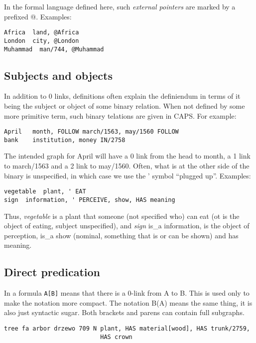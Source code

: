 \documentclass[11pt,bookmarks,bookmarksnumbered,naturalnames,plainpages=false,pdftex,colorlinks=true,urlcolor=blue,bookmarksdepth=subsection,plainpages=false]{paper}
\begin{document}
In the formal language defined here, such {\it external pointers} are marked
by a prefixed @. Examples:

\begin{verbatim}
Africa	land, @Africa	
London	city, @London	
Muhammad  man/744, @Muhammad	
\end{verbatim}

\subsection{Subjects and objects}\label{subjobj}

In addition to 0 links, definitions often explain the definiendum in terms of
it being the subject or object of some binary relation. When not defined by
some more primitive term, such binary telations are given in CAPS.  For
example:

\begin{verbatim}
April   month, FOLLOW march/1563, may/1560 FOLLOW
bank    institution, money IN/2758
\end{verbatim}

\noindent
The intended graph for April will have a 0 link from the head to month, a 1
link to march/1563 and a 2 link to may/1560. Often, what is at the other side
of the binary is unspecified, in which case we use the ' symbol ``plugged
up''.  Examples:

\begin{verbatim}
vegetable  plant, ' EAT
sign  information, ' PERCEIVE, show, HAS meaning
\end{verbatim}

\noindent
Thus, {\it vegetable} is a plant that someone (not specified who) can eat (ot
is the object of eating, subject unspecified), and {\it sign} is\_a
information, is the object of perception, is\_a show (nominal, something that
is or can be shown) and has meaning.

\subsection{Direct predication}\label{isa}

In a formula {\tt A[B]} means that there is a 0-link from A to B. This is used
only to make the notation more compact. The notation B(A) means the same
thing, it is also just syntactic sugar. Both brackets and parens can contain
full subgraphs. 

\begin{verbatim}
tree fa arbor drzewo 709 N plant, HAS material[wood], HAS trunk/2759, 
                           HAS crown 
\end{verbatim}
\end{document}
